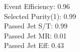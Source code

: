 Event Efficiency:   0.96\\ 
Selected Purity(1): 0.99\\ 
Passed Jet S/T:     0.99\\ 
Passed Jet MR:      0.01\\ 
Passed Jet Eff:     0.43